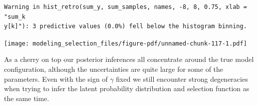 \documentclass[
  letterpaper,
  DIV=11,
  numbers=noendperiod]{scrartcl}
\newenvironment{Shaded}{\begin{snugshade}}{\end{snugshade}}
\newcommand{\AttributeTok}[1]{\textcolor[rgb]{0.40,0.45,0.13}{#1}}
\newcommand{\ControlFlowTok}[1]{\textcolor[rgb]{0.00,0.23,0.31}{#1}}
\newcommand{\DecValTok}[1]{\textcolor[rgb]{0.68,0.00,0.00}{#1}}
\newcommand{\FloatTok}[1]{\textcolor[rgb]{0.68,0.00,0.00}{#1}}
\newcommand{\FunctionTok}[1]{\textcolor[rgb]{0.28,0.35,0.67}{#1}}
\newcommand{\NormalTok}[1]{\textcolor[rgb]{0.00,0.23,0.31}{#1}}
\newcommand{\OtherTok}[1]{\textcolor[rgb]{0.00,0.23,0.31}{#1}}
\newcommand{\SpecialCharTok}[1]{\textcolor[rgb]{0.37,0.37,0.37}{#1}}
\newcommand{\StringTok}[1]{\textcolor[rgb]{0.13,0.47,0.30}{#1}}
\begin{document}
\begin{Shaded}
\end{Shaded}

\begin{verbatim}
Warning in hist_retro(sum_y, sum_samples, names, -8, 8, 0.75, xlab = "sum_k
y[k]"): 3 predictive values (0.0%) fell below the histogram binning.
\end{verbatim}

\texttt{[image: modeling\_selection\_files/figure-pdf/unnamed-chunk-117-1.pdf]}

As a cherry on top our posterior inferences all concentrate around the
true model configuration, although the uncertainties are quite large for
some of the parameters. Even with the sign of \(\gamma\) fixed we still
encounter strong degeneracies when trying to infer the latent
probability distribution and selection function as the same time.
\end{document}
